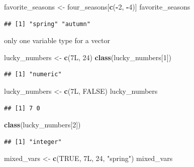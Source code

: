 \documentclass[
]{book}
\newenvironment{Shaded}{\begin{snugshade}}{\end{snugshade}}
\newcommand{\ConstantTok}[1]{\textcolor[rgb]{0.56,0.35,0.01}{#1}}
\newcommand{\DecValTok}[1]{\textcolor[rgb]{0.00,0.00,0.81}{#1}}
\newcommand{\FunctionTok}[1]{\textcolor[rgb]{0.13,0.29,0.53}{\textbf{#1}}}
\newcommand{\NormalTok}[1]{#1}
\newcommand{\OtherTok}[1]{\textcolor[rgb]{0.56,0.35,0.01}{#1}}
\newcommand{\SpecialCharTok}[1]{\textcolor[rgb]{0.81,0.36,0.00}{\textbf{#1}}}
\newcommand{\StringTok}[1]{\textcolor[rgb]{0.31,0.60,0.02}{#1}}
\theoremstyle{definition}
\theoremstyle{definition}
\theoremstyle{definition}
\theoremstyle{definition}
\theoremstyle{remark}
\begin{document}
\begin{Shaded}
\begin{Highlighting}[]
\NormalTok{favorite\_seasons }\OtherTok{\textless{}{-}}\NormalTok{ four\_seasons[}\FunctionTok{c}\NormalTok{(}\SpecialCharTok{{-}}\DecValTok{2}\NormalTok{, }\SpecialCharTok{{-}}\DecValTok{4}\NormalTok{)]}
\NormalTok{favorite\_seasons}
\end{Highlighting}
\end{Shaded}

\begin{verbatim}
## [1] "spring" "autumn"
\end{verbatim}

only one variable type for a vector

\begin{Shaded}
\begin{Highlighting}[]
\NormalTok{lucky\_numbers }\OtherTok{\textless{}{-}} \FunctionTok{c}\NormalTok{(7L, }\DecValTok{24}\NormalTok{)}
\FunctionTok{class}\NormalTok{(lucky\_numbers[}\DecValTok{1}\NormalTok{])}
\end{Highlighting}
\end{Shaded}

\begin{verbatim}
## [1] "numeric"
\end{verbatim}

\begin{Shaded}
\begin{Highlighting}[]
\NormalTok{lucky\_numbers }\OtherTok{\textless{}{-}} \FunctionTok{c}\NormalTok{(7L, }\ConstantTok{FALSE}\NormalTok{)}
\NormalTok{lucky\_numbers}
\end{Highlighting}
\end{Shaded}

\begin{verbatim}
## [1] 7 0
\end{verbatim}

\begin{Shaded}
\begin{Highlighting}[]
\FunctionTok{class}\NormalTok{(lucky\_numbers[}\DecValTok{2}\NormalTok{])}
\end{Highlighting}
\end{Shaded}

\begin{verbatim}
## [1] "integer"
\end{verbatim}

\begin{Shaded}
\begin{Highlighting}[]
\NormalTok{mixed\_vars }\OtherTok{\textless{}{-}} \FunctionTok{c}\NormalTok{(}\ConstantTok{TRUE}\NormalTok{, 7L, }\DecValTok{24}\NormalTok{, }\StringTok{"spring"}\NormalTok{)}
\NormalTok{mixed\_vars}
\end{Highlighting}
\end{Shaded}
\end{document}
